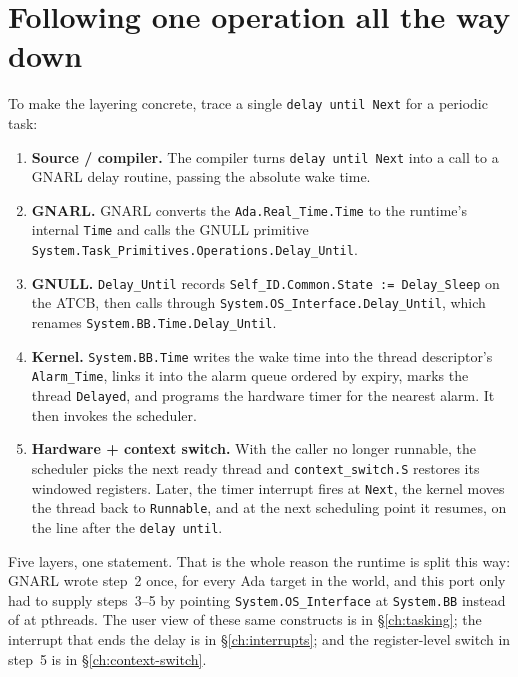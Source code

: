 \section{Following one operation all the way down}

To make the layering concrete, trace a single \texttt{delay until Next} for a
periodic task:

\begin{enumerate}
  \item \textbf{Source / compiler.} The compiler turns \texttt{delay until Next}
        into a call to a GNARL delay routine, passing the absolute wake time.
  \item \textbf{GNARL.} GNARL converts the \texttt{Ada.Real\_Time.Time} to the
        runtime's internal \texttt{Time} and calls the GNULL primitive
        \texttt{System.Task\_Primitives.Operations.Delay\_Until}.
  \item \textbf{GNULL.} \texttt{Delay\_Until} records
        \texttt{Self\_ID.Common.State := Delay\_Sleep} on the ATCB, then calls
        through \texttt{System.OS\_Interface.Delay\_Until}, which renames
        \texttt{System.BB.Time.Delay\_Until}.
  \item \textbf{Kernel.} \texttt{System.BB.Time} writes the wake time into the
        thread descriptor's \texttt{Alarm\_Time}, links it into the alarm queue
        ordered by expiry, marks the thread \texttt{Delayed}, and programs the
        hardware timer for the nearest alarm. It then invokes the scheduler.
  \item \textbf{Hardware + context switch.} With the caller no longer runnable,
        the scheduler picks the next ready thread and \texttt{context\_switch.S}
        restores its windowed registers. Later, the timer interrupt fires at
        \texttt{Next}, the kernel moves the thread back to \texttt{Runnable}, and
        at the next scheduling point it resumes, on the line after the
        \texttt{delay until}.
\end{enumerate}

Five layers, one statement. That is the whole reason the runtime is split this
way: GNARL wrote step~2 once, for every Ada target in the world, and this port
only had to supply steps~3--5 by pointing \texttt{System.OS\_Interface} at
\texttt{System.BB} instead of at pthreads. The user view of these same
constructs is in \S\ref{ch:tasking}; the interrupt that ends the delay is in
\S\ref{ch:interrupts}; and the register-level switch in step~5 is in
\S\ref{ch:context-switch}.
